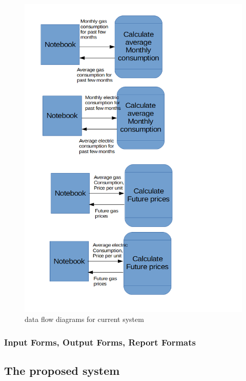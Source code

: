 \begin{figure}[H]
    \includegraphics[width=\textwidth]{./dataflowdiagrams2.png}
    \caption{data flow diagrams for current system} \label{fig:dataflowdiagrams}
\end{figure}

\subsubsection{Input Forms, Output Forms, Report Formats}

\subsection{The proposed system}

